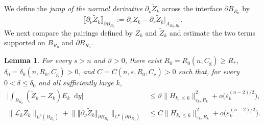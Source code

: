 \documentclass[11pt]{article}
\numberwithin{equation}{section}
\newtheorem{lemma}[theorem]{Lemma}
\theoremstyle{remark}
\newcommand{\dd}{\mathop{}\!\mathrm{d}}
\begin{document}
 We define the \emph{jump of the normal derivative} $\partial_\nu\widetilde Z_k$ across the interface $\partial B_{R_0}$ by
{
\[
 \llbracket\partial_\nu\widetilde Z_k\rrbracket_{\partial B_{R_0}}
 :=\partial_rZ_k-
 \partial_r\widetilde Z_k\big|_{A_{R_0,R_k}}.
\]
}
 We next compare the pairings defined by $Z_k$ and $\widetilde Z_k$ and
estimate the two terms supported on $B_{R_0}$ and $\partial B_{R_0}$.
\begin{lemma}\label{lem:adjoint-replacement-interface}
For every $s>n$ and $\vartheta>0$, there exist
$R_0=R_0(n,C_{\mathrm g})\ge R_*$,
$\delta_0=\delta_0(n,R_0,C_{\mathrm g})>0$, and
$C=C(n,s,R_0,C_{\mathrm g})>0$ such that, for every
$0<\delta\le\delta_0$ and all sufficiently large $k$,
{
\[
\begin{aligned}
 \Big|\int_{B_{R_k}}(\widetilde Z_k-Z_k)E_k\dd y\Big|
 &\le\vartheta\|H_{k,\le6}\|_{\varepsilon_k,R_k}^2
 +o\bigl(\varepsilon_k^{(n-2)/2}\bigr),\\
 \|\mathcal L_kZ_k\|_{L^s(B_{R_0})}
 +\Big\|\llbracket\partial_\nu\widetilde Z_k\rrbracket_{\partial B_{R_0}}
  \Big\|_{C^0(\partial B_{R_0})}
 &\le C\|H_{k,\le6}\|_{\varepsilon_k,R_k}^2
 +o\bigl(\varepsilon_k^{(n-2)/2}\bigr).
\end{aligned}
\]
}
 \end{lemma}
\end{document}
